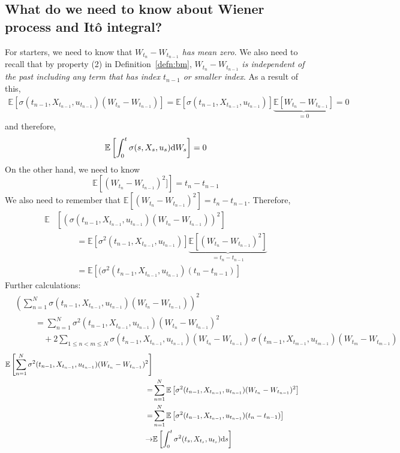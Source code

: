 \documentclass[11pt]{book}
\newcommand{\ds}{\text{\normalfont d}s}
\newcommand{\dW}{\text{\normalfont d}W}
\begin{document}
\subsection{What do we need to know about Wiener process and Itô integral?}
\label{sec:toknow_Wiener}
For starters, we need to know that \emph{$W_{t_{n}}-W_{t_{n-1}}$ has mean zero}. 
We also need to recall that by property (2) in Definition~\ref{defn:bm}, \emph{$W_{t_{n}}-W_{t_{n-1}}$ is independent of the past including any term that has index $t_{n-1}$ or smaller index}.
As a result of this, 
\[
\begin{split}
    \mathbb{E}\left[\sigma(t_{n-1},X_{t_{n-1}},u_{t_{n-1}})(W_{t_{n}}-W_{t_{n-1}})\right]=\mathbb{E}\left[\sigma(t_{n-1},X_{t_{n-1}},u_{t_{n-1}})\right]\underbrace{\mathbb{E}\left[W_{t_{n}}-W_{t_{n-1}}\right]}_{=0}=0
\end{split}
\]
and therefore, 
\[
\mathbb{E}\left[\int_0^t \sigma(s,X_s,u_s)\dW_s\right]=0
\]
On the other hand, we need to know 
\[
\mathbb{E}\left[(W_{t_{n}}-W_{t_{n-1}})^2]\right]=t_n-t_{n-1}
\]
We also need to remember that \emph{$\mathbb{E}\left[(W_{t_{n}}-W_{t_{n-1}})^2\right]=t_{n}-t_{n-1}$}.
Therefore, 
\[
\begin{split}
    \mathbb{E}&\left[\left(\sigma(t_{n-1},X_{t_{n-1}},u_{t_{n-1}})(W_{t_{n}}-W_{t_{n-1}})\right)^2\right]\\
    &\hspace{1cm}=\mathbb{E}\left[\sigma^2(t_{n-1},X_{t_{n-1}},u_{t_{n-1}})\right]\underbrace{\mathbb{E}\left[(W_{t_{n}}-W_{t_{n-1}})^2\right]}_{=t_{n}-t_{n-1}}\\
    &\hspace{1cm}=\mathbb{E}\left[(\sigma^2(t_{n-1},X_{t_{n-1}},u_{t_{n-1}})(t_{n}-t_{n-1})\right]
\end{split}
\]
Further calculations:
\[
\begin{split}
    &\left(\sum_{n=1}^{N} \sigma(t_{n-1},X_{t_{n-1}},u_{t_{n-1}})(W_{t_{n}}-W_{t_{n-1}})\right)^2\\
    &\hspace{1cm}=\sum_{n=1}^{N} \sigma^2(t_{n-1},X_{t_{n-1}},u_{t_{n-1}})(W_{t_{n}}-W_{t_{n-1}})^2\\
    &\hspace{1cm}\quad+2\sum_{1\le n<m\le N} \sigma(t_{n-1},X_{t_{n-1}},u_{t_{n-1}})(W_{t_{n}}-W_{t_{n-1}})\,\sigma(t_{m-1},X_{t_{m-1}},u_{t_{m-1}})(W_{t_{m}}-W_{t_{m-1}})
\end{split}
\]
\[
\begin{split}
    \mathbb{E}\left[\sum_{n=1}^{N} \sigma^2(t_{n-1},X_{t_{n-1}},u_{t_{n-1}})(W_{t_{n}}-W_{t_{n-1}})^2\right] 
    \\
    = &\sum_{n=1}^{N}\mathbb{E}\left[\sigma^2(t_{n-1},X_{t_{n-1}},u_{t_{n-1}})(W_{t_{n}}-W_{t_{n-1}})^2\right] \\
    = &\sum_{n=1}^{N}\mathbb{E}\left[\sigma^2(t_{n-1},X_{t_{n-1}},u_{t_{n-1}})({t_{n}}-{t_{n-1}})\right]
    \\
    \to &
    \mathbb{E} \left[\int_0^t\sigma^2(t_{s},X_{t_{s}},u_{t_{s}})\ds\right]
\end{split}
\]
\end{document}
